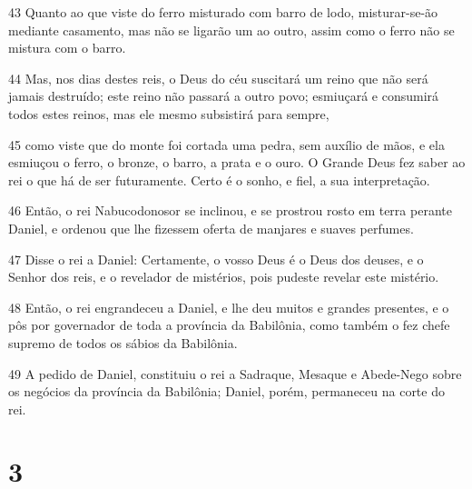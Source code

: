 \par 43 Quanto ao que viste do ferro misturado com barro de lodo, misturar-se-ão mediante casamento, mas não se ligarão um ao outro, assim como o ferro não se mistura com o barro.
\par 44 Mas, nos dias destes reis, o Deus do céu suscitará um reino que não será jamais destruído; este reino não passará a outro povo; esmiuçará e consumirá todos estes reinos, mas ele mesmo subsistirá para sempre,
\par 45 como viste que do monte foi cortada uma pedra, sem auxílio de mãos, e ela esmiuçou o ferro, o bronze, o barro, a prata e o ouro. O Grande Deus fez saber ao rei o que há de ser futuramente. Certo é o sonho, e fiel, a sua interpretação.
\par 46 Então, o rei Nabucodonosor se inclinou, e se prostrou rosto em terra perante Daniel, e ordenou que lhe fizessem oferta de manjares e suaves perfumes.
\par 47 Disse o rei a Daniel: Certamente, o vosso Deus é o Deus dos deuses, e o Senhor dos reis, e o revelador de mistérios, pois pudeste revelar este mistério.
\par 48 Então, o rei engrandeceu a Daniel, e lhe deu muitos e grandes presentes, e o pôs por governador de toda a província da Babilônia, como também o fez chefe supremo de todos os sábios da Babilônia.
\par 49 A pedido de Daniel, constituiu o rei a Sadraque, Mesaque e Abede-Nego sobre os negócios da província da Babilônia; Daniel, porém, permaneceu na corte do rei.

\chapter{3}

